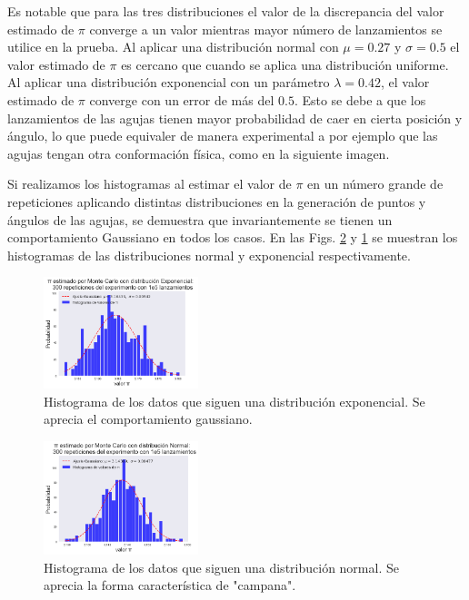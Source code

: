 \documentclass{rbf}
\begin{document}
Es notable que para las tres distribuciones el valor de la discrepancia del valor estimado de $\pi$ converge a un valor mientras mayor número de lanzamientos se utilice en la prueba. Al aplicar una distribución normal con $\mu=0.27$ y  $\sigma=0.5$ el valor estimado de $\pi$ es cercano que cuando se aplica una distribución uniforme. Al aplicar una distribución exponencial con un parámetro $\lambda=0.42$, el valor estimado de $\pi$ converge con un error de más del $0.5$. Esto se debe a que los lanzamientos de las agujas tienen mayor probabilidad de caer en cierta posición y ángulo, lo que puede equivaler de manera experimental a por ejemplo que las agujas tengan otra conformación física, como en la siguiente imagen.


Si realizamos los histogramas al estimar el valor de $\pi$ en un número grande de repeticiones aplicando distintas distribuciones en la generación de puntos y ángulos de las agujas, se demuestra que invariantemente se tienen un comportamiento Gaussiano en todos los casos.
 En las Figs. \ref{buff9} y \ref{buff8} se muestran los histogramas de las distribuciones normal y exponencial respectivamente. 

\begin{figure}[tbp!]
 \centering
  \includegraphics[width=0.4\textwidth]{figures/exp.png}
	\caption{Histograma de los datos que siguen una distribución exponencial. Se aprecia el comportamiento gaussiano.}
 \label{buff8}
\end{figure}

\begin{figure}[h]
 \centering
  \includegraphics[width=0.4\textwidth]{figures/norm.png}
	\caption{Histograma de los datos que siguen una distribución normal. Se aprecia la forma característica de "campana".}
 \label{buff9}
\end{figure}
\end{document}
